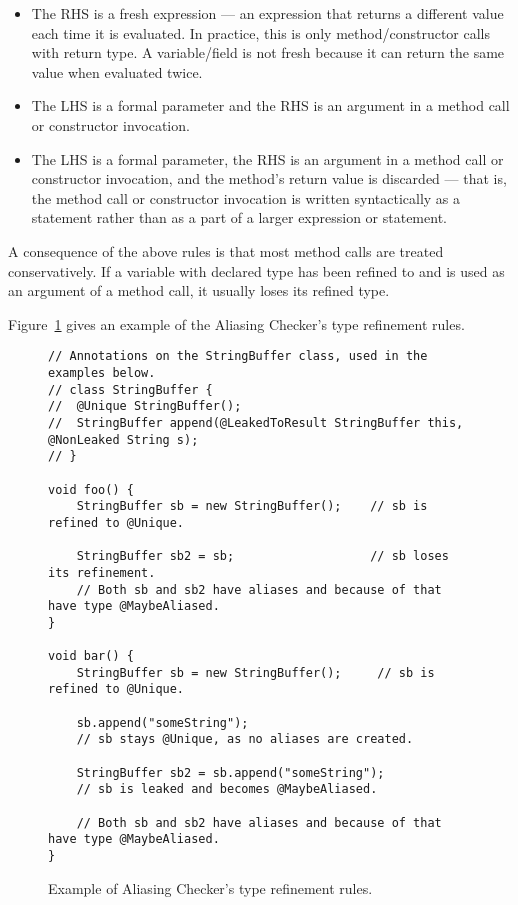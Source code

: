 \begin{itemize}
\item
The RHS is a fresh expression --- an expression that returns a different value
each time it is evaluated. In practice, this is only method/constructor calls
with  return type. A variable/field is not fresh because it can
return the same value when evaluated twice.
\item
The LHS is a  formal parameter and the RHS is an argument in a
method call or constructor invocation.
\item
The LHS is a  formal parameter, the RHS is an argument in
a method call or constructor invocation, and the method's return value is
discarded --- that is, the method call or constructor invocation is written
syntactically as a statement rather than as a part of a larger expression or
statement.
\end{itemize}

A consequence of the above rules is that most method calls are treated conservatively.
If a variable with declared type  has been refined
to  and is used as an argument of a method call, it usually loses its
 refined type.


Figure~\ref{fig-aliasing-refinement-example} gives an example of the Aliasing Checker's
type refinement rules.

\begin{figure}
\begin{smaller}
\begin{Verbatim}
// Annotations on the StringBuffer class, used in the examples below.
// class StringBuffer {
//  @Unique StringBuffer();
//  StringBuffer append(@LeakedToResult StringBuffer this, @NonLeaked String s);
// }

void foo() {
    StringBuffer sb = new StringBuffer();    // sb is refined to @Unique.

    StringBuffer sb2 = sb;                   // sb loses its refinement.
    // Both sb and sb2 have aliases and because of that have type @MaybeAliased.
}

void bar() {
    StringBuffer sb = new StringBuffer();     // sb is refined to @Unique.

    sb.append("someString");
    // sb stays @Unique, as no aliases are created.

    StringBuffer sb2 = sb.append("someString");
    // sb is leaked and becomes @MaybeAliased.

    // Both sb and sb2 have aliases and because of that have type @MaybeAliased.
}

\end{Verbatim}
\end{smaller}
\caption{Example of Aliasing Checker's type refinement rules.}
\label{fig-aliasing-refinement-example}
\end{figure}

